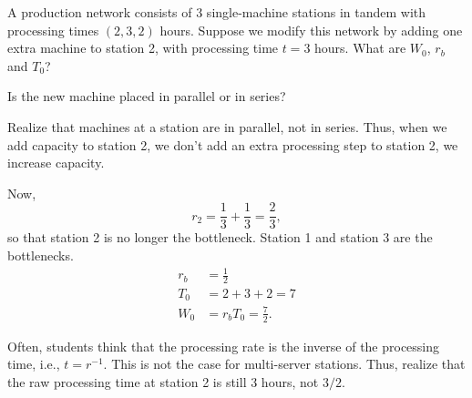 \begin{exercise}
  A production network consists of 3 single-machine stations in tandem
  with processing times $(2, 3, 2)$ hours.  Suppose we modify this
  network by adding one extra machine to station 2, with processing
  time $t=3$ hours.  What are $W_0$, $r_b$ and $T_0$?
  \begin{hint}
Is the new machine placed in parallel or in series?
  \end{hint}
  \begin{solution}
    Realize that machines at a station are in parallel, not in
    series. Thus, when we add capacity to station 2, we don't add an
    extra processing step to station 2, we increase capacity. 

    Now, 
    \begin{equation*}
      r_2 = \frac13 + \frac13 = \frac 23,
    \end{equation*}
    so that station 2 is no longer the bottleneck. Station 1 and
    station 3 are the bottlenecks.
    \begin{align*}
      r_b &= \frac12 \\
      T_0 &= 2 + 3 + 2 = 7\\
      W_0 &= r_b T_0 = \frac72.
    \end{align*}

    Often, students think that the processing rate is the inverse of
    the processing time, i.e., $t=r^{-1}$. This is not the case for
    multi-server stations. Thus, realize that the raw processing time
    at station 2 is still $3$ hours, not $3/2$.
  \end{solution}
\end{exercise}


